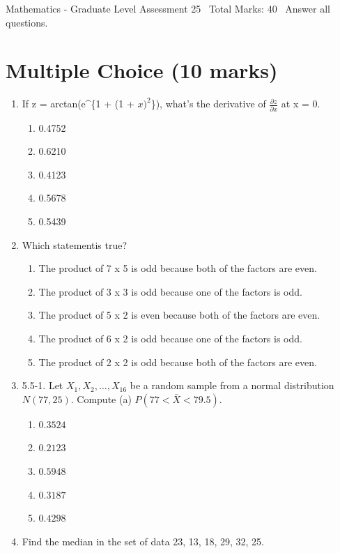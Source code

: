 \documentclass[12pt]{article}
\begin{document}
\begin{center}
Mathematics - Graduate Level Assessment 25 \
Total Marks: 40 \
Answer all questions.
\end{center}

\section*{Multiple Choice (10 marks)}
\begin{enumerate}[label=\arabic*.]
\item If z = arctan(e^\{1 + (1 + $x)^2$\}), what's the derivative of $\frac{\partial z}{\partial x}$ at x = 0.
\begin{enumerate}[label=(\alph*)]
    \item 0.4752
    \item 0.6210
    \item 0.4123
    \item 0.5678
    \item 0.5439
\end{enumerate}
\item Which statementis true?
\begin{enumerate}[label=(\alph*)]
    \item The product of 7 x 5 is odd because both of the factors are even.
    \item The product of 3 x 3 is odd because one of the factors is odd.
    \item The product of 5 x 2 is even because both of the factors are even.
    \item The product of 6 x 2 is odd because one of the factors is odd.
    \item The product of 2 x 2 is odd because both of the factors are even.
\end{enumerate}
\item 5.5-1. Let $X_1, X_2, \ldots, X_{16}$ be a random sample from a normal distribution $N(77,25)$. Compute (a) $P(77<\bar{X}<79.5)$.
\begin{enumerate}[label=(\alph*)]
    \item $0.3524$
    \item $0.2123$
    \item $0.5948$
    \item $0.3187$
    \item $0.4298$
\end{enumerate}
\item Find the median in the set of data 23, 13, 18, 29, 32, 25.
\begin{enumerate}[label=(\alph*)]

\end{enumerate}
\end{enumerate}
\end{document}
